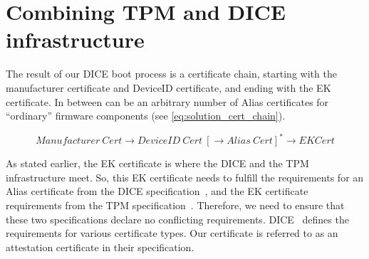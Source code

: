 




\section{Combining TPM and DICE infrastructure}

The result of our DICE boot process is a certificate chain, starting with the manufacturer certificate and DeviceID certificate, and ending with the EK certificate.
In between can be an arbitrary number of Alias certificates for ``ordinary'' firmware components (see \autoref{eq:solution_cert_chain}).

\begin{equation}
\label{eq:solution_cert_chain}
Manufacturer\ Cert \rightarrow DeviceID\ Cert\ [\rightarrow Alias\ Cert]^* \rightarrow EK Cert
\end{equation}

As stated earlier, the EK certificate is where the DICE and the TPM infrastructure meet.
So, this EK certificate needs to fulfill the requirements for an Alias certificate from the DICE specification~\cite{DICE_certs}, and the EK certificate requirements from the TPM specification~\cite{tcg-ek}.
Therefore, we need to ensure that these two specifications declare no conflicting requirements.
DICE~\cite{DICE_certs} defines the requirements for various certificate types.
Our certificate is referred to as an attestation certificate in their specification.

